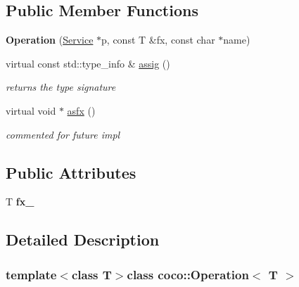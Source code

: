 \subsection*{Public Member Functions}
\begin{DoxyCompactItemize}
\item 
\hypertarget{classcoco_1_1_operation_aadc84fbebeb0cf9f3cafd24a0e3f7732}{{\bfseries Operation} (\hyperlink{classcoco_1_1_service}{Service} $\ast$p, const T \&fx, const char $\ast$name)}\label{classcoco_1_1_operation_aadc84fbebeb0cf9f3cafd24a0e3f7732}

\item 
\hypertarget{classcoco_1_1_operation_a196a7c6007b1963f3cb3132fa42c119d}{virtual const std\-::type\-\_\-info \& \hyperlink{classcoco_1_1_operation_a196a7c6007b1963f3cb3132fa42c119d}{assig} ()}\label{classcoco_1_1_operation_a196a7c6007b1963f3cb3132fa42c119d}

\begin{DoxyCompactList}\small\item\em returns the type signature \end{DoxyCompactList}\item 
virtual void $\ast$ \hyperlink{classcoco_1_1_operation_aaa229518aa337c5cb8d4070e620c67d2}{asfx} ()
\begin{DoxyCompactList}\small\item\em commented for future impl \end{DoxyCompactList}\end{DoxyCompactItemize}
\subsection*{Public Attributes}
\begin{DoxyCompactItemize}
\item 
\hypertarget{classcoco_1_1_operation_acccf803b570558885b87da7bcbd633be}{T {\bfseries fx\-\_\-}}\label{classcoco_1_1_operation_acccf803b570558885b87da7bcbd633be}

\end{DoxyCompactItemize}


\subsection{Detailed Description}
\subsubsection*{template$<$class T$>$class coco\-::\-Operation$<$ T $>$}

